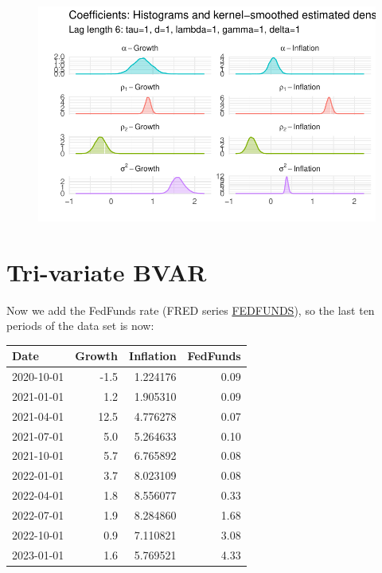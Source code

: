 \documentclass[
  letterpaper,
]{book}
\begin{document}
\begin{figure}

{\centering \includegraphics{./BVAR_files/figure-pdf/unnamed-chunk-9-4.pdf}

}

\end{figure}

\hypertarget{tri-variate-bvar}{%
\section{Tri-variate BVAR}\label{tri-variate-bvar}}

Now we add the FedFunds rate (FRED series
\href{https://fred.stlouisfed.org/series/FEDFUNDS}{FEDFUNDS}), so the
last ten periods of the data set is now:

\begin{longtable}[]{@{}lrrr@{}}
\toprule()
Date & Growth & Inflation & FedFunds \\
\midrule()
\endhead
2020-10-01 & -1.5 & 1.224176 & 0.09 \\
2021-01-01 & 1.2 & 1.905310 & 0.09 \\
2021-04-01 & 12.5 & 4.776278 & 0.07 \\
2021-07-01 & 5.0 & 5.264633 & 0.10 \\
2021-10-01 & 5.7 & 6.765892 & 0.08 \\
2022-01-01 & 3.7 & 8.023109 & 0.08 \\
2022-04-01 & 1.8 & 8.556077 & 0.33 \\
2022-07-01 & 1.9 & 8.284860 & 1.68 \\
2022-10-01 & 0.9 & 7.110821 & 3.08 \\
2023-01-01 & 1.6 & 5.769521 & 4.33 \\
\bottomrule()
\end{longtable}
\end{document}
